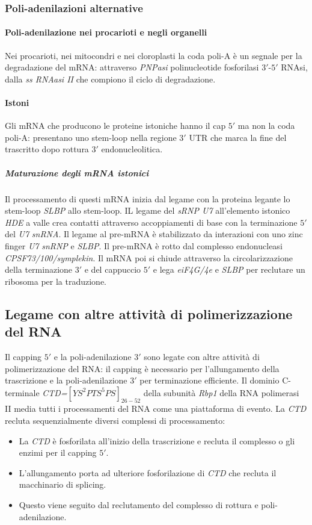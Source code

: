 \subsubsection{Poli-adenilazioni alternative}
\paragraph{Poli-adenilazione nei procarioti e negli organelli}
Nei procarioti, nei mitocondri e nei cloroplasti la coda poli-A \`e un segnale per la degradazione del mRNA: attraverso \emph{PNPasi} polinucleotide fosforilasi $3'$-$5'$ RNAsi, dalla
\emph{ss RNAasi II} che compiono il ciclo di degradazione.
\paragraph{Istoni}
Gli mRNA che producono le proteine istoniche hanno il cap $5'$ ma non la coda poli-A: presentano uno stem-loop nella regione $3'$ UTR che marca la fine del trascritto dopo rottura
$3'$ endonucleolitica. 
\subparagraph{Maturazione degli mRNA istonici}
Il processamento di questi mRNA inizia dal legame con la proteina legante lo stem-loop \emph{SLBP} allo stem-loop. IL legame del \emph{sRNP U7} all'elemento istonico \emph{HDE} a valle
crea contatti attraverso accoppiamenti di base con la terminazione $5'$ del \emph{U7} \emph{snRNA}. Il legame al pre-mRNA \`e stabilizzato da interazioni con uno zinc finger 
\emph{U7} \emph{snRNP} e \emph{SLBP}. Il pre-mRNA \`e rotto dal complesso endonucleasi \emph{CPSF73/100/symplekin}. Il mRNA poi si chiude attraverso la circolarizzazione della 
terminazione $3'$ e del cappuccio $5'$ e lega \emph{eiF4G/4e} e \emph{SLBP} per reclutare un ribosoma per la traduzione. 
\subsection{Legame con altre attivit\`a di polimerizzazione del RNA}
Il capping $5'$ e la poli-adenilazione $3'$ sono legate con altre attivit\`a di polimerizzazione del RNA: il capping \`e necessario per l'allungamento della trascrizione e la
poli-adenilazione $3'$ per terminazione efficiente. Il dominio C-terminale \emph{CTD=$[YS^2PTS^5PS]_{26-52}$} della subunit\`a \emph{Rbp1} della RNA polimerasi II media tutti i 
processamenti del RNA come una piattaforma di evento. La \emph{CTD} recluta sequenzialmente diversi complessi di processamento:
\begin{itemize}
	\item La \emph{CTD} \`e fosforilata all'inizio della trascrizione e recluta il complesso o gli enzimi per il capping $5'$. 
	\item L'allungamento porta ad ulteriore fosforilazione di \emph{CTD} che recluta il macchinario di splicing.
	\item Questo viene seguito dal reclutamento del complesso di rottura e poli-adenilazione.
\end{itemize}
